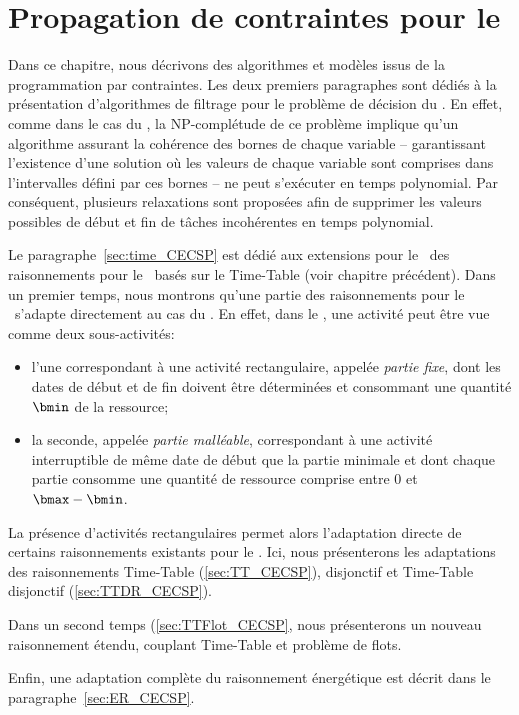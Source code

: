 \chapter{Propagation de contraintes pour le 
\CECSP}
\label{sec:PPC_CECSP}
Dans ce chapitre, nous décrivons des algorithmes et modèles issus de
la programmation par contraintes. Les deux premiers paragraphes sont
dédiés à la présentation d'algorithmes de filtrage pour le problème
de décision du \CECSP. En effet, comme dans le cas du \CUSP, la
NP-complétude de ce problème implique qu'un algorithme assurant la
cohérence des bornes de chaque variable -- garantissant l'existence
d'une solution où les valeurs de chaque variable sont comprises dans
l'intervalles défini par ces bornes -- ne peut s'exécuter en temps
polynomial. Par conséquent, plusieurs relaxations sont proposées afin
de supprimer les valeurs possibles de début et fin de tâches
incohérentes en temps polynomial.

Le paragraphe~\ref{sec:time_CECSP} est dédié aux extensions pour le
\CECSP~des raisonnements pour le \CUSP~basés sur le Time-Table (voir
chapitre précédent). Dans un premier temps, nous montrons qu'une
partie des raisonnements pour le \CUSP~s'adapte directement au cas du
\CECSP. En effet, dans le \CECSP, une activité peut être vue comme
deux sous-activités:
\begin{itemize}
\item l'une correspondant à une activité rectangulaire, appelée {\it
partie fixe}, dont les dates de début et de fin doivent être
déterminées et consommant une quantité $\bmin$ de la ressource;
\item la seconde, appelée {\it partie malléable}, correspondant à une
activité interruptible de même date de début que la partie minimale et
dont chaque partie consomme une quantité de ressource comprise entre
$0$ et $\bmax-\bmin$.
\end{itemize}
La présence d'activités rectangulaires permet alors l'adaptation directe
de certains raisonnements existants pour le \CUSP. Ici, nous
présenterons les adaptations des raisonnements Time-Table
(\ref{sec:TT_CECSP}), disjonctif et Time-Table disjonctif
(\ref{sec:TTDR_CECSP}).  

Dans un second temps (\ref{sec:TTFlot_CECSP}, nous présenterons un nouveau
raisonnement étendu, couplant Time-Table et problème de flots. 

Enfin, une adaptation complète du raisonnement énergétique est décrit
dans le paragraphe~\ref{sec:ER_CECSP}.






